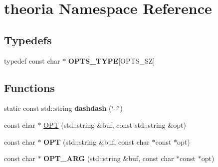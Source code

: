 \hypertarget{namespacetheoria}{}\section{theoria Namespace Reference}
\label{namespacetheoria}
\subsection*{Typedefs}
\begin{DoxyCompactItemize}
\item 
\mbox{\label{namespacetheoria_afcc67236902b4e9949cae14f36e033f1}} 
typedef const char $\ast$ {\bfseries O\+P\+T\+S\+\_\+\+T\+Y\+PE}\mbox{[}O\+P\+T\+S\+\_\+\+SZ\mbox{]}
\end{DoxyCompactItemize}
\subsection*{Functions}
\begin{DoxyCompactItemize}
\item 
\mbox{\label{namespacetheoria_a2461ee397964667138bdba02d62d209e}} 
static const std\+::string {\bfseries dashdash} (\char`\"{}-\/-\/\char`\"{})
\item 
const char $\ast$ \hyperlink{namespacetheoria_ad064111544bc341abc915fd30ee47659}{O\+PT} (std\+::string \&buf, const std\+::string \&opt)
\item 
\mbox{\label{namespacetheoria_a85d5a54b09f9bbacd06a09c1ec6ad988}} 
const char $\ast$ {\bfseries O\+PT} (std\+::string \&buf, const char $\ast$const $\ast$opt)
\item 
\mbox{\label{namespacetheoria_a5f1bb243314deb7a5330558aa907aaaf}} 
const char $\ast$ {\bfseries O\+P\+T\+\_\+\+A\+RG} (std\+::string \&buf, const char $\ast$const $\ast$opt)
\end{DoxyCompactItemize}
